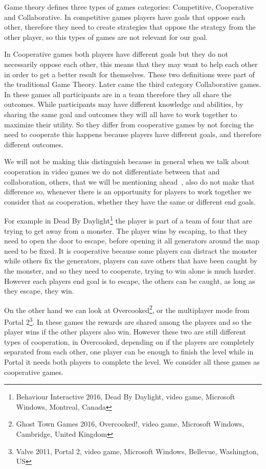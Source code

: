 \documentclass[runningheads]{llncs}
\begin{document}
Game theory defines three types of games categories: Competitive, Cooperative and Collaborative. In competitive games players have goals that oppose each other, therefore they need to create strategies that oppose the strategy from the other player, so this types of games are not relevant for our goal.

In Cooperative games both players have different goals but they do not necessarily oppose each other, this means that they may want to help each other in order to get a better result for themselves. These two definitions were part of the traditional Game Theory. Later came the third category Collaborative games. In these games all participants are in a team therefore they all share the outcomes. While participants may have different knowledge and abilities, by sharing the same goal and outcomes they will all have to work together to maximize their utility. So they differ from cooperative games by not forcing the need to cooperate this happens because players have different goals, and therefore different outcomes.

We will not be making this distinguish because in general when we talk about cooperation in video games we do not differentiate between that and collaboration, others, that we will be mentioning ahead~\cite{ref_rocha}\cite{ref_magy}, also do not make that difference so, whenever there is an opportunity for players to work together we consider that as cooperation, whether they have the same or different end goals.

For example in Dead By Daylight\footnote{Behaviour Interactive 2016, Dead By Daylight, video game, Microsoft Windows, Montreal, Canada} the player is part of a team of four that are trying to get away from a monster. The player wins by escaping, to that they need to open the door to escape, before opening it all generators around the map need to be fixed. It is cooperative because some players can distract the monster while others fix the generators, players can save others that have been caught by the monster, and so they need to cooperate, trying to win alone is much harder. However each players end goal is to escape, the others can be caught, as long as they escape, they win.

On the other hand we can look at Overcooked\footnote{Ghost Town Games 2016, Overcooked!, video game, Microsoft Windows, Cambridge, United Kingdom}, or the multiplayer mode from Portal 2\footnote{Valve 2011, Portal 2, video game, Microsoft Windows, Bellevue, Washington, US}. In these games the rewards are shared among the players and so the player wins if the other players also win. However these two are still different types of cooperation, in Overcooked, depending on if the players are completely separated from each other, one player can be enough to finish the level while in Portal it needs both players to complete the level. We consider all these games as cooperative games.
\end{document}
